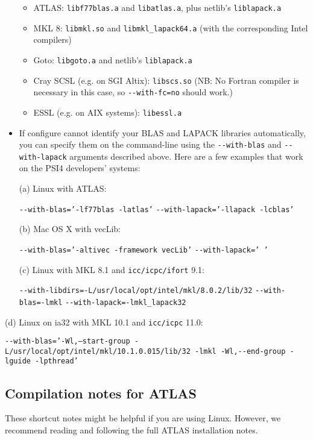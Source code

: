 \documentclass[12pt]{article}
\begin{document}
\begin{itemize}
\begin{itemize}  
    \item ATLAS: {\tt libf77blas.a} and {\tt libatlas.a}, plus netlib's
    {\tt liblapack.a}
    \item MKL 8: {\tt libmkl.so} and {\tt libmkl\_lapack64.a} (with the corresponding Intel compilers)
    \item Goto: {\tt libgoto.a} and netlib's {\tt liblapack.a}
    \item Cray SCSL (e.g. on SGI Altix): {\tt libscs.so} (NB: No Fortran compiler
      is necessary in this case, so {\tt -}{\tt -with-fc=no} should work.)
    \item ESSL (e.g. on AIX systems): {\tt libessl.a}
    \end{itemize}  
  \item If configure cannot identify your BLAS and LAPACK libraries
    automatically, you can specify them on the command-line using the
    {\tt -}{\tt -with-blas} and {\tt -}{\tt -with-lapack} arguments
    described above.  Here are a few examples that work on the PSI4
    developers' systems:
  
    (a) Linux with ATLAS:
  
    {\tt -}{\tt -with-blas='-lf77blas -latlas'} {\tt -}{\tt -with-lapack='-llapack -lcblas'}

    (b) Mac OS X with vecLib: 
  
    {\tt -}{\tt -with-blas='-altivec -framework vecLib'} {\tt -}{\tt -with-lapack=' '}
  
    (c) Linux with MKL 8.1 and {\tt icc/icpc/ifort} 9.1: 
  
    {\tt -}{\tt -with-libdirs=-L/usr/local/opt/intel/mkl/8.0.2/lib/32} {\tt -}{\tt -with-blas=-lmkl} {\tt -}{\tt -with-lapack=-lmkl\_lapack32}
\end{itemize}

    (d) Linux on ia32 with MKL 10.1 and {\tt icc/icpc} 11.0:

    {\tt -}{\tt -with-blas='-Wl,--start-group -L/usr/local/opt/intel/mkl/10.1.0.015/lib/32 -lmkl -Wl,}{\tt -}{\tt -end-group -lguide -lpthread'}

\subsection{Compilation notes for ATLAS}
   These shortcut notes might be helpful if you are using Linux.  However,
   we recommend reading and following the full ATLAS installation notes.
\end{document}
